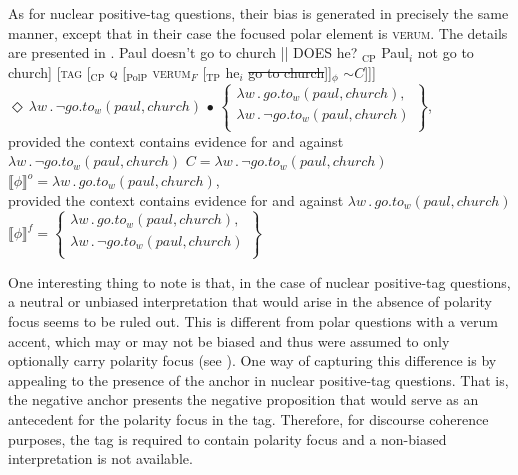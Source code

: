 \documentclass[output=paper,colorlinks,citecolor=brown]{langscibook}
\begin{document}
As for  nuclear positive-tag questions, their bias is generated in precisely the same manner, except that in their case the focused polar element is \textsc{verum}. The details are presented in .
\ea Paul doesn't go to church || DOES he?\label{nPTQ.Anyls}
    \ea {[[}$_{\text{CP}}$ Paul$_i$ not go to church] [\textsc{tag} {[}$_{\text{CP}}$ \textsc{q} [$_{\text{PolP}}$ \textsc{verum}$_{F}$  [$_{\text{TP}}$ he$_i$ \sout{go to church}]]$_{\phi}$ $\sim C$]]]\label{nPTQ.LF}
    \ex $\Diamond \, \lambda w \, . \, \neg go.to_w(paul,church) \, \bullet \, 
            \left\{ \begin{array}{l}
            \lambda w \, . \, go.to_w(paul,church), \\ 
            \lambda w \, . \,\neg go.to_w(paul,church) \\ 
            \end{array} \right\}$, \\
            provided the context contains evidence for and against $\lambda w \, . \, \neg go.to_w(paul,church)$
    \ex  $C = \lambda w \, . \, \neg go.to_w(paul,church)$\label{nPTQ.C}
    \ex $\llbracket \phi \rrbracket^{o} = \lambda w \, . \, go.to_w(paul,church)$, \\
            provided the context contains evidence for and against $\lambda w \, . \, go.to_w(paul,church)$\label{nPTQ.phi}
    \ex $\llbracket \phi \rrbracket^{f} = \left\{ \begin{array}{l}
            \lambda w \, . \, go.to_w(paul,church), \\ 
            \lambda w \, . \,\neg go.to_w(paul,church) \\ 
            \end{array} \right\}  $
    \z
\z

One interesting thing to note is that, in the case of  nuclear positive-tag questions, a neutral or unbiased interpretation that would arise in the absence of polarity focus seems to be ruled out. This is different from polar questions with a verum accent, which may or may not be biased and thus were assumed to only optionally carry polarity focus (see ). One way of capturing this difference is by appealing to the presence of the anchor in  nuclear positive-tag questions. That is, the negative anchor presents the negative proposition that would serve as an antecedent for the polarity focus in the tag. Therefore, for discourse coherence purposes, the tag is required to contain polarity focus and a non-biased interpretation is not available. 
\end{document}
